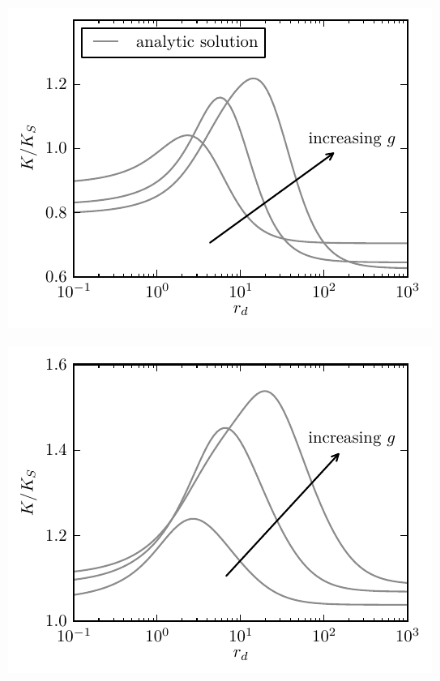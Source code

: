 \begin{minipage}[t]{.5 \textwidth}
    \begin{figure}[H]
        \hspace{-0.05 \textwidth}\includegraphics[width = 1.05 \textwidth]{plots/g2_rb_rates.pdf}
    \end{figure}
\end{minipage}\begin{minipage}[t]{.5 \textwidth}
    \begin{figure}[H]
        \includegraphics[width = 1.05 \textwidth]{plots/g2_ab_rates.pdf}
    \end{figure}
\end{minipage}

